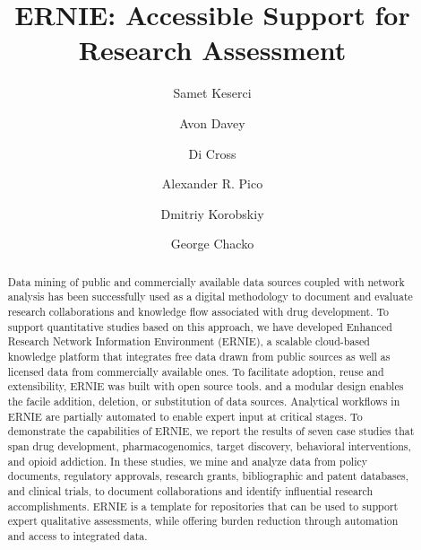 \documentclass[review]{elsarticle}
\begin{document}
\begin{frontmatter}

\title{ERNIE: Accessible Support for Research Assessment}

\author[nl]{Samet Keserci}
\author[nl]{Avon Davey}
\author[ca]{Di Cross}
\author[gi]{Alexander R. Pico}
\author[nl]{Dmitriy Korobskiy}
\author[nl]{George Chacko }



\address[nl]{NETE Labs, NET ESolutions Corporation, McLean, VA, USA}
\address[ca]{Research Data Science \& Evaluation, Clarivate Analytics, USA}
\address[gi]{Gladstone Institutes, San Francisco, CA, USA}

\raggedright

\begin{abstract}

Data mining of public and commercially available data sources coupled with network analysis has been successfully used as a digital methodology to document and evaluate research collaborations and knowledge flow associated with drug development. To support quantitative studies based on this approach, we have developed Enhanced Research Network Information Environment (ERNIE), a scalable cloud-based knowledge platform that integrates free data drawn from public sources as well as licensed data from commercially available ones. To facilitate adoption, reuse and extensibility, ERNIE was built with open source tools. and a modular design enables the facile addition, deletion, or substitution of data sources. Analytical workflows in ERNIE are partially automated to enable expert input at critical stages. To demonstrate the capabilities of ERNIE, we report the results of seven case studies that span drug development, pharmacogenomics, target discovery, behavioral interventions, and opioid addiction. In these studies, we mine and analyze data from policy documents, regulatory approvals, research grants, bibliographic and patent databases, and clinical trials, to document collaborations and identify influential research accomplishments. ERNIE is a template for repositories that can be used to support expert qualitative assessments, while offering burden reduction through automation and access to integrated data.

\end{abstract}


\end{frontmatter}
\end{document}
